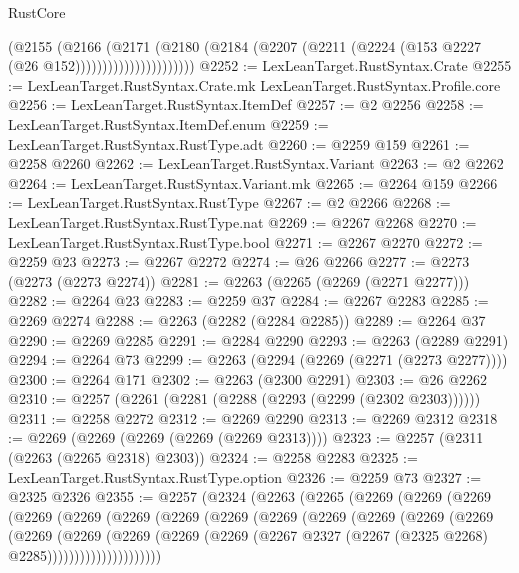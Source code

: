 \begin{lexlean}{RustCore}
\begin{coremodule}
                            (@2155
                              (@2166
                                (@2171
                                  (@2180
                                    (@2184
                                      (@2207
                                        (@2211 (@2224 (@153 @2227 (@26 @152))))))))))))))))))))))
@2252 := LexLeanTarget.RustSyntax.Crate
@2255 := LexLeanTarget.RustSyntax.Crate.mk LexLeanTarget.RustSyntax.Profile.core
@2256 := LexLeanTarget.RustSyntax.ItemDef
@2257 := @2 @2256
@2258 := LexLeanTarget.RustSyntax.ItemDef.enum
@2259 := LexLeanTarget.RustSyntax.RustType.adt
@2260 := @2259 @159
@2261 := @2258 @2260
@2262 := LexLeanTarget.RustSyntax.Variant
@2263 := @2 @2262
@2264 := LexLeanTarget.RustSyntax.Variant.mk
@2265 := @2264 @159
@2266 := LexLeanTarget.RustSyntax.RustType
@2267 := @2 @2266
@2268 := LexLeanTarget.RustSyntax.RustType.nat
@2269 := @2267 @2268
@2270 := LexLeanTarget.RustSyntax.RustType.bool
@2271 := @2267 @2270
@2272 := @2259 @23
@2273 := @2267 @2272
@2274 := @26 @2266
@2277 := @2273 (@2273 (@2273 @2274))
@2281 := @2263 (@2265 (@2269 (@2271 @2277)))
@2282 := @2264 @23
@2283 := @2259 @37
@2284 := @2267 @2283
@2285 := @2269 @2274
@2288 := @2263 (@2282 (@2284 @2285))
@2289 := @2264 @37
@2290 := @2269 @2285
@2291 := @2284 @2290
@2293 := @2263 (@2289 @2291)
@2294 := @2264 @73
@2299 := @2263 (@2294 (@2269 (@2271 (@2273 @2277))))
@2300 := @2264 @171
@2302 := @2263 (@2300 @2291)
@2303 := @26 @2262
@2310 := @2257 (@2261 (@2281 (@2288 (@2293 (@2299 (@2302 @2303))))))
@2311 := @2258 @2272
@2312 := @2269 @2290
@2313 := @2269 @2312
@2318 := @2269 (@2269 (@2269 (@2269 (@2269 @2313))))
@2323 := @2257 (@2311 (@2263 (@2265 @2318) @2303))
@2324 := @2258 @2283
@2325 := LexLeanTarget.RustSyntax.RustType.option
@2326 := @2259 @73
@2327 := @2325 @2326
@2355 := @2257
    (@2324
      (@2263
        (@2265
          (@2269
            (@2269
              (@2269
                (@2269
                  (@2269
                    (@2269
                      (@2269
                        (@2269
                          (@2269
                            (@2269
                              (@2269
                                (@2269
                                  (@2269
                                    (@2269
                                      (@2269
                                        (@2269
                                          (@2269
                                            (@2269
                                              (@2267
                                                @2327
                                                (@2267 (@2325 @2268) @2285)))))))))))))))))))))

\end{coremodule}
\end{lexlean}
